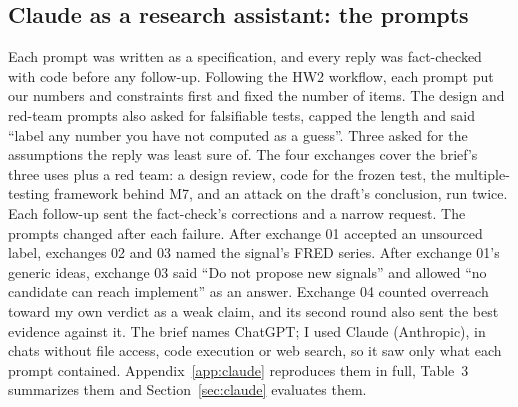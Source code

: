 \subsection{Claude as a research assistant: the prompts}
\label{sec:prompts}

Each prompt was written as a specification, and every reply was fact-checked with code before any follow-up. Following the HW2 workflow, each prompt put our numbers and constraints first and fixed the number of items. The design and red-team prompts also asked for falsifiable tests, capped the length and said ``label any number you have not computed as a guess''. Three asked for the assumptions the reply was least sure of. The four exchanges cover the brief's three uses plus a red team: a design review, code for the frozen test, the multiple-testing framework behind M7, and an attack on the draft's conclusion, run twice. Each follow-up sent the fact-check's corrections and a narrow request. The prompts changed after each failure. After exchange 01 accepted an unsourced label, exchanges 02 and 03 named the signal's FRED series. After exchange 01's generic ideas, exchange 03 said ``Do not propose new signals'' and allowed ``no candidate can reach implement'' as an answer. Exchange 04 counted overreach toward my own verdict as a weak claim, and its second round also sent the best evidence against it. The brief names ChatGPT; I used Claude (Anthropic), in chats without file access, code execution or web search, so it saw only what each prompt contained. Appendix~\ref{app:claude} reproduces them in full, Table~3 summarizes them and Section~\ref{sec:claude} evaluates them.

